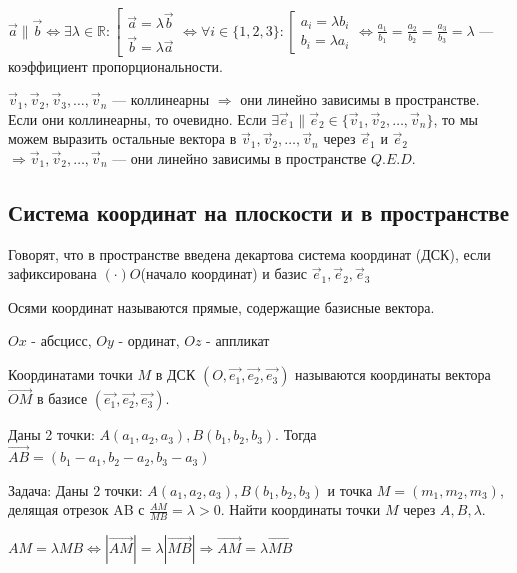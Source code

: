 \documentclass[twoside]{book}
\begin{document}
\(\vec a \parallel \vec b \Leftrightarrow \exists \lambda \in \mathbb{R}:
\left[
\begin{array}{ll}
    \vec a = \lambda \vec b \\
    \vec b = \lambda \vec a
\end{array}
\right .
\Leftrightarrow
\forall i \in \{1, 2, 3\}:
\left[
\begin{array}{ll}
    a_i = \lambda b_i \\
    b_i = \lambda a_i
\end{array}
\right .
\Leftrightarrow \frac{a_1}{b_1} = \frac{a_2}{b_2} = \frac{a_3}{b_3} = \lambda\) --- коэффициент пропорциональности.

\(\vec v_1, \vec v_2, \vec v_3, \dots, \vec v_n\) --- коллинеарны \(\Rightarrow\) они линейно зависимы в пространстве. Если они коллинеарны, то очевидно. Если \(\exists \vec e_1 \parallel \vec e_2 \in \{\vec v_1, \vec v_2, \dots, \vec v_n\}\), то мы можем выразить остальные вектора в \(\vec v_1, \vec v_2, \dots, \vec v_n\) через \(\vec e_1\) и \(\vec e_2\) \(\Rightarrow \vec v_1, \vec v_2, \dots, \vec v_n\) --- они линейно зависимы в пространстве \(Q.E.D.\)


\subsection{Система координат на плоскости и в пространстве}

Говорят, что в пространстве введена декартова система координат (ДСК), если зафиксирована \((\cdot) O \)(начало координат) и базис \(\vec{e}_1, \vec{e}_2, \vec{e}_3\)

Осями координат называются прямые, содержащие базисные вектора.

\(Ox\) - абсцисс, \(Oy\) - ординат, \(Oz\) - аппликат

Координатами точки \(M\) в ДСК \((O, \vec{e_1}, \vec{e_2}, \vec{e_3})\) называются координаты вектора \(\vec{OM}\) в базисе \((\vec{e_1}, \vec{e_2}, \vec{e_3})\).

Даны 2 точки: \(A(a_1, a_2, a_3), B(b_1, b_2, b_3)\). Тогда \(\overrightarrow{AB} = (b_1-a_1,b_2-a_2,b_3-a_3)\)

Задача: Даны 2 точки: \(A(a_1, a_2, a_3), B(b_1, b_2, b_3)\) и точка \(M = (m_1, m_2, m_3)\), делящая отрезок AB с \(\frac{AM}{MB}=\lambda > 0\). Найти координаты точки \(M\) через \(A, B, \lambda\).

\(AM = \lambda MB \Leftrightarrow |\vec{AM}| = \lambda |\vec{MB}| \Rightarrow \vec{AM} = \lambda \vec{MB}\)
\end{document}
